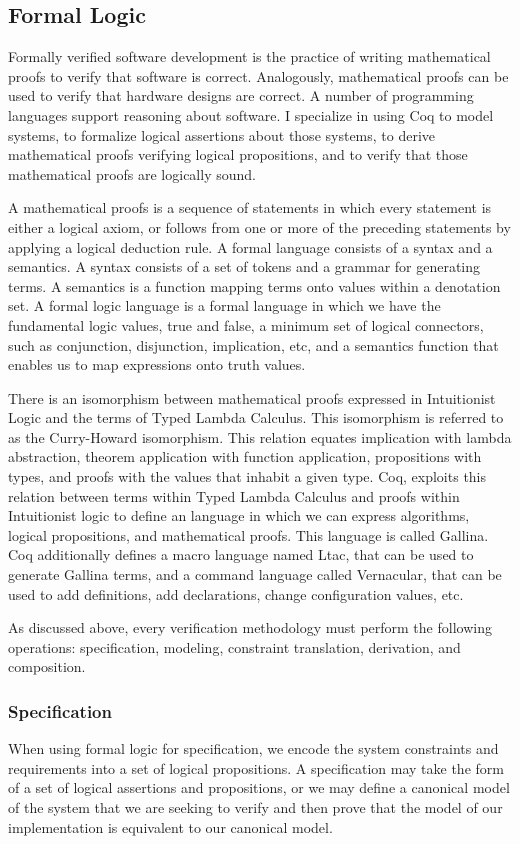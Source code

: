 \documentclass[10pt,a4paper]{article}
\begin{document}
\subsection{Formal Logic}
Formally verified software development is the practice of writing mathematical proofs to verify that software is correct. Analogously, mathematical proofs can be used to verify that hardware designs are correct. A number of programming languages support reasoning about software. I specialize in using Coq to model systems, to formalize logical assertions about those systems, to derive mathematical proofs verifying logical propositions, and to verify that those mathematical proofs are logically sound.

A mathematical proofs is a sequence of statements in which every statement is either a logical axiom, or follows from one or more of the preceding statements by applying a logical deduction rule. A formal language consists of a syntax and a semantics. A syntax consists of a set of tokens and a grammar for generating terms. A semantics is a function mapping terms onto values within a denotation set. A formal logic language is a formal language in which we have the fundamental logic values, true and false, a minimum set of logical connectors, such as conjunction, disjunction, implication, etc, and a semantics function that enables us to map expressions onto truth values.

There is an isomorphism between mathematical proofs expressed in Intuitionist Logic and the terms of Typed Lambda Calculus. This isomorphism is referred to as the Curry-Howard isomorphism. This relation equates implication with lambda abstraction, theorem application with function application, propositions with types, and proofs with the values that inhabit a given type. Coq, exploits this relation between terms within Typed Lambda Calculus and proofs within Intuitionist logic to define an language in which we can express algorithms, logical propositions, and mathematical proofs. This language is called Gallina. Coq additionally defines a macro language named Ltac, that can be used to generate Gallina terms, and a command language called Vernacular, that can be used to add definitions, add declarations, change configuration values, etc.

As discussed above, every verification methodology must perform the following operations: specification, modeling, constraint translation, derivation, and composition.

\subsubsection{Specification}
When using formal logic for specification, we encode the system constraints and requirements into a set of logical propositions. A specification may take the form of a set of logical assertions and propositions, or we may define a canonical model of the system that we are seeking to verify and then prove that the model of our implementation is equivalent to our canonical model.
\end{document}
